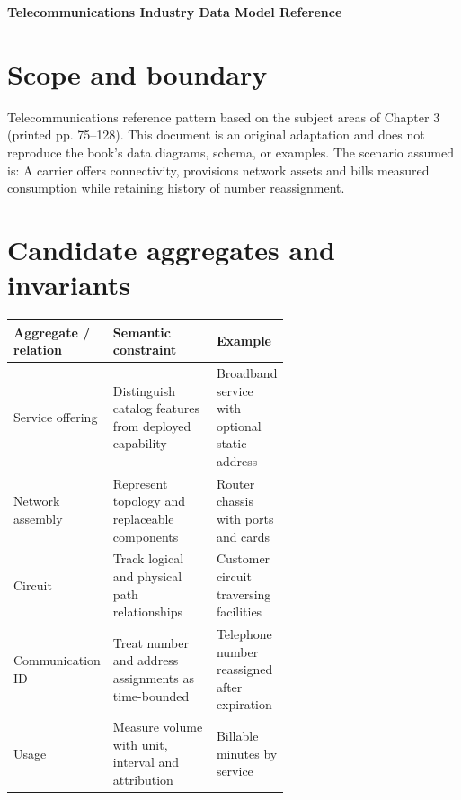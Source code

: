 \documentclass[11pt,letterpaper]{article}
\begin{document}
\begin{center}
{\LARGE\bfseries\color{navy} Telecommunications Industry Data Model Reference}\par
\vspace{0.25em}{\large Conceptual to logical reference | original adaptation}\par
{}
\end{center}
\vspace{0.8em}
\section{Scope and boundary}
Telecommunications reference pattern based on the subject areas of Chapter 3 (printed pp. 75--128). This document is an original adaptation and does not reproduce the book's data diagrams, schema, or examples. The scenario assumed is: A carrier offers connectivity, provisions network assets and bills measured consumption while retaining history of number reassignment.


\section{Candidate aggregates and invariants}
\begin{tabularx}{\linewidth}{@{}>{\raggedright\arraybackslash}p{0.23\linewidth} >{\raggedright\arraybackslash}p{0.38\linewidth}>{\raggedright\arraybackslash}X@{}}
\toprule
\textbf{Aggregate / relation} & \textbf{Semantic constraint} & \textbf{Example} \\ 
\midrule
Service offering & Distinguish catalog features from deployed capability & Broadband service with optional static address \\ 
Network assembly & Represent topology and replaceable components & Router chassis with ports and cards \\ 
Circuit & Track logical and physical path relationships & Customer circuit traversing facilities \\ 
Communication ID & Treat number and address assignments as time-bounded & Telephone number reassigned after expiration \\ 
Usage & Measure volume with unit, interval and attribution & Billable minutes by service \\ 
\bottomrule
\end{tabularx}
\end{document}
